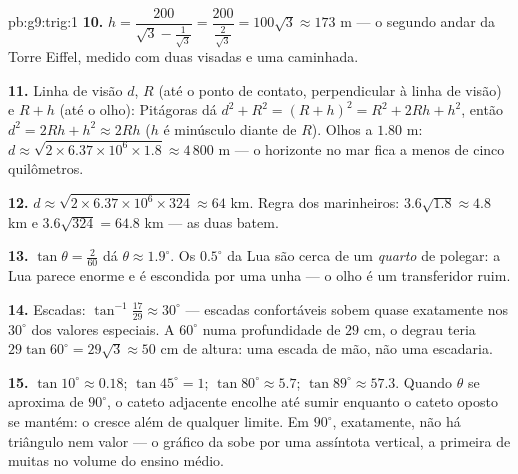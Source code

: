 \begin{solution}{pb:g9:trig:1}
\textbf{10.} $h = \dfrac{200}{\sqrt3 - \frac{1}{\sqrt3}}
= \dfrac{200}{\frac{2}{\sqrt3}} = 100\sqrt3 \approx 173$ m --- o
segundo andar da Torre Eiffel, medido com duas visadas e uma caminhada.

\textbf{11.} Linha de visão $d$,  $R$ (até o ponto de contato,
perpendicular à linha de visão) e $R + h$ (até o olho): Pitágoras dá
$d^2 + R^2 = (R + h)^2 = R^2 + 2Rh + h^2$, então
$d^2 = 2Rh + h^2 \approx 2Rh$ ($h$ é minúsculo diante de $R$). Olhos a
$1.80$ m: $d \approx \sqrt{2 \times 6.37 \times 10^6 \times 1.8}
\approx 4\,800$ m --- o horizonte no mar fica a menos de cinco
quilômetros.

\textbf{12.} $d \approx \sqrt{2 \times 6.37 \times 10^6 \times 324}
\approx 64$ km. Regra dos marinheiros: $3.6\sqrt{1.8} \approx 4.8$ km e
$3.6\sqrt{324} = 64.8$ km --- as duas batem.

\textbf{13.} $\tan\theta = \frac{2}{60}$ dá
$\theta \approx 1.9^\circ$. Os $0.5^\circ$ da Lua são cerca de um
\emph{quarto} de polegar: a Lua parece enorme e é escondida por uma
unha --- o olho é um transferidor ruim.

\textbf{14.} Escadas: $\tan^{-1}\frac{17}{29} \approx 30^\circ$ ---
escadas confortáveis sobem quase exatamente nos $30^\circ$ dos valores
especiais. A $60^\circ$ numa profundidade de $29$ cm, o degrau teria
$29\tan 60^\circ = 29\sqrt3 \approx 50$ cm de altura: uma escada de mão,
não uma escadaria.

\textbf{15.} $\tan 10^\circ \approx 0.18$; $\tan 45^\circ = 1$;
$\tan 80^\circ \approx 5.7$; $\tan 89^\circ \approx 57.3$. Quando
$\theta$ se aproxima de $90^\circ$, o cateto adjacente encolhe até
sumir enquanto o cateto oposto se mantém: o  cresce além de
qualquer limite. Em $90^\circ$, exatamente, não há triângulo nem valor
--- o gráfico da  sobe por uma assíntota vertical, a primeira
de muitas no volume do ensino médio.
\end{solution}

